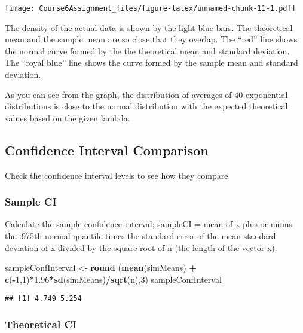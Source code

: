 \documentclass[]{article}
\newenvironment{Shaded}{\begin{snugshade}}{\end{snugshade}}
\newcommand{\KeywordTok}[1]{\textcolor[rgb]{0.13,0.29,0.53}{\textbf{#1}}}
\newcommand{\DecValTok}[1]{\textcolor[rgb]{0.00,0.00,0.81}{#1}}
\newcommand{\FloatTok}[1]{\textcolor[rgb]{0.00,0.00,0.81}{#1}}
\newcommand{\StringTok}[1]{\textcolor[rgb]{0.31,0.60,0.02}{#1}}
\newcommand{\OperatorTok}[1]{\textcolor[rgb]{0.81,0.36,0.00}{\textbf{#1}}}
\newcommand{\NormalTok}[1]{#1}
\begin{document}
\texttt{[image: Course6Assignment\_files/figure-latex/unnamed-chunk-11-1.pdf]}

The density of the actual data is shown by the light blue bars. The
theoretical mean and the sample mean are so close that they overlap. The
``red'' line shows the normal curve formed by the the theoretical mean
and standard deviation. The ``royal blue'' line shows the curve formed
by the sample mean and standard deviation.

As you can see from the graph, the distribution of averages of 40
exponential distributions is close to the normal distribution with the
expected theoretical values based on the given lambda.

\subsection{Confidence Interval
Comparison}\label{confidence-interval-comparison}

Check the confidence interval levels to see how they compare.

\subsubsection{Sample CI}\label{sample-ci}

Calculate the sample confidence interval; sampleCI = mean of x plus or
minus the .975th normal quantile times the standard error of the mean
standard deviation of x divided by the square root of n (the length of
the vector x).

\begin{Shaded}
\begin{Highlighting}[]
\NormalTok{sampleConfInterval <-}\StringTok{ }\KeywordTok{round}\NormalTok{ (}\KeywordTok{mean}\NormalTok{(simMeans) }\OperatorTok{+}\StringTok{ }\KeywordTok{c}\NormalTok{(}\OperatorTok{-}\DecValTok{1}\NormalTok{,}\DecValTok{1}\NormalTok{)}\OperatorTok{*}\FloatTok{1.96}\OperatorTok{*}\KeywordTok{sd}\NormalTok{(simMeans)}\OperatorTok{/}\KeywordTok{sqrt}\NormalTok{(n),}\DecValTok{3}\NormalTok{)}
\NormalTok{sampleConfInterval}
\end{Highlighting}
\end{Shaded}

\begin{verbatim}
## [1] 4.749 5.254
\end{verbatim}

\subsubsection{Theoretical CI}\label{theoretical-ci}
\end{document}
